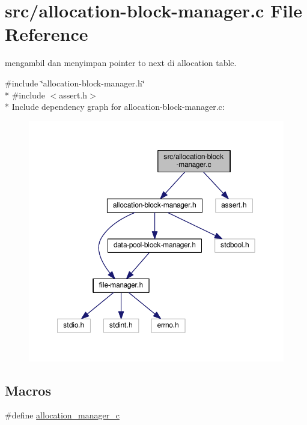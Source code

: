 \hypertarget{allocation-block-manager_8c}{\section{src/allocation-\/block-\/manager.c File Reference}
\label{allocation-block-manager_8c}
}


mengambil dan menyimpan pointer to next di allocation table.  


{\ttfamily \#include \char`\"{}allocation-\/block-\/manager.\-h\char`\"{}}\\*
{\ttfamily \#include $<$assert.\-h$>$}\\*
Include dependency graph for allocation-\/block-\/manager.c\-:\nopagebreak
\begin{figure}[H]
\begin{center}
\leavevmode
\includegraphics[width=350pt]{allocation-block-manager_8c__incl}
\end{center}
\end{figure}
\subsection*{Macros}
\begin{DoxyCompactItemize}
\item 
\#define \hyperlink{allocation-block-manager_8c_a7c27d1e5590b712625952d2abcef87f2}{allocation\-\_\-manager\-\_\-c}
\end{DoxyCompactItemize}
